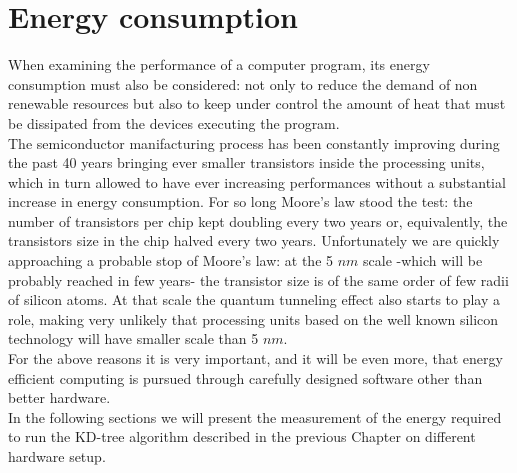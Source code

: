 \chapter{Energy consumption}\label{ch:power}
When examining the performance of a computer program, its energy consumption must also be considered: not only to reduce the demand of non renewable resources but also to keep under control the amount of heat that must be dissipated from the devices executing the program.\\
The semiconductor manifacturing process has been constantly improving during the past 40 years bringing ever smaller transistors inside the processing units, which in turn allowed to have ever increasing performances without a substantial increase in energy consumption. For so long Moore's law stood the test: the number of transistors per chip kept doubling every two years or, equivalently, the transistors size in the chip halved every two years.
Unfortunately we are quickly approaching a probable stop of Moore's law: at the 5 $\unit{nm}$ scale -which will be probably reached in few years- the transistor size is of the same order of few radii of silicon atoms. At that scale the quantum tunneling effect also starts to play a role, making very unlikely that processing units based on the well known silicon technology will have smaller scale than 5 $\unit{nm}$.\\
For the above reasons it is very important, and it will be even more, that energy efficient computing is pursued through carefully designed software other than better hardware.\\
In the following sections we will present the measurement of the energy required to run the KD-tree algorithm described in the previous Chapter on different hardware setup.

